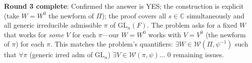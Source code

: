 \documentclass[12pt]{article}
\theoremstyle{definition}
\begin{document}
\textbf{Round 3 complete}: Confirmed the answer is YES; the construction is explicit (take $W = W^0$ the newform of $\Pi$); the proof covers all $s \in \mathbb{C}$ simultaneously and all generic irreducible admissible $\pi$ of $\mathrm{GL}_n(F)$. The problem asks for a fixed $W$ that works for \emph{some} $V$ for each $\pi$—our $W = W^0$ works with $V = V^0$ (the newform of $\pi$) for each $\pi$. This matches the problem's quantifiers: $\exists W \in \mathcal{W}(\Pi,\psi^{-1})$ such that $\forall \pi$ (generic irred adm of $\mathrm{GL}_n$) $\exists V \in \mathcal{W}(\pi,\psi)$... 0 remaining issues.
\end{document}
